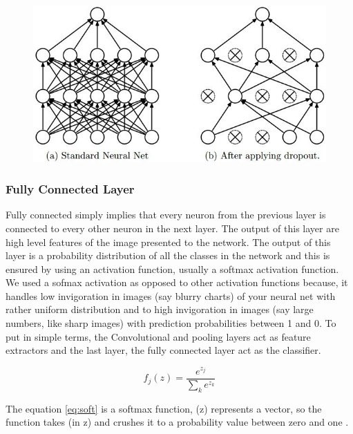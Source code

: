 \documentclass[12pt, a4paper,oneside]{report}
\begin{document}
\begin{figure}[!htb]
	\includegraphics [scale=0.6] {dropout}
	
	\label{fig:dropout}
\end{figure}


\subsubsection{Fully Connected Layer}
Fully connected simply implies that every neuron from the previous layer is connected to every other neuron in the next layer. The output of this layer are high level features of the image presented to the network. The output of this layer is a probability distribution of all the classes in the network and this is ensured by using an activation function, usually a softmax activation function. We used a sofmax activation as opposed to other activation functions because, it handles low invigoration
in images (say blurry charts) of your neural net with rather uniform distribution and to high invigoration in images (say large numbers, like sharp images) with prediction probabilities between 1 and 0. To put in simple terms, the Convolutional and pooling layers act as feature extractors and the last layer, the fully connected layer act as the classifier.

\begin{equation} \label{eq:soft}
f_j(z) = \frac{e^{z_j}}{\sum_k e^{z_k}}
\end{equation}

The equation \ref{eq:soft} is a softmax function, (z) represents a vector, so the function takes (in z) and crushes it to a probability value between zero and one \cite{softmax}.
\end{document}
